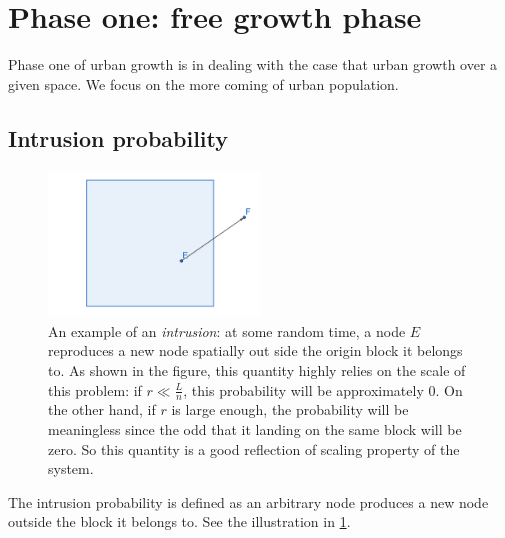 \documentclass[aps,prl]{revtex4-1}
\begin{document}
\section{Phase one: free growth phase}

Phase one of urban growth is in dealing with the case that urban growth over a given space. We focus on the more coming of urban population.

\subsection{Intrusion probability}

\begin{figure}[b]
	\centering
	\includegraphics[width = 0.5\textwidth]{fig/intrusion_eg}
	\caption{An example of an \emph{intrusion}: at some random time, a node $E$ reproduces a new node spatially out side the origin block it belongs to. As shown in the figure, this quantity highly relies on the scale of this problem: if $r \ll \frac{L}{n}$, this probability will be approximately $0$. On the other hand, if $r$ is large enough, the probability will be meaningless since the odd that it landing on the same block will be zero. So this quantity is a good reflection of scaling property of the system. }\label{fig:intrusion_eg}
\end{figure}

The intrusion probability is defined as an arbitrary node produces a new node outside the block it belongs to. See the illustration in \ref{fig:intrusion_eg}.
\end{document}
